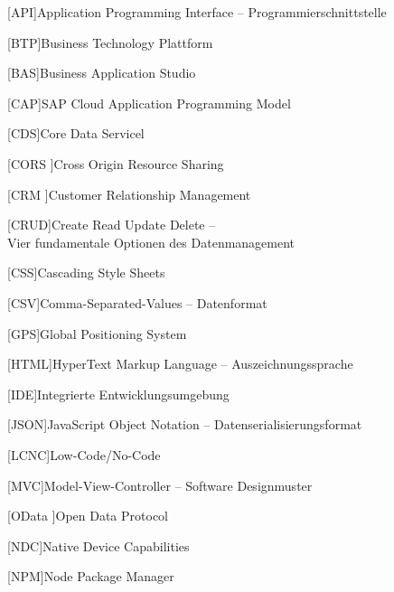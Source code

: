 

\begin{acronym}[EUDAMED]


[API]{Application Programming Interface -- Programmierschnittstelle}

[BTP]{Business Technology Plattform}

[BAS]{Business Application Studio}

[CAP]{SAP Cloud Application Programming Model}

[CDS]{Core Data Servicel}

[CORS ]{Cross Origin Resource Sharing}

[CRM ]{Customer Relationship Management}

[CRUD]{Create Read Update Delete -- \\Vier fundamentale Optionen des Datenmanagement}

[CSS]{Cascading Style Sheets}

[CSV]{Comma-Separated-Values -- Datenformat}

[GPS]{Global Positioning System}

[HTML]{HyperText Markup Language -- Auszeichnungssprache}

[IDE]{Integrierte Entwicklungsumgebung}

[JSON]{JavaScript Object Notation -- Datenserialisierungsformat}

[LCNC]{Low-Code/No-Code}

[MVC]{Model-View-Controller -- Software Designmuster}

[OData ]{Open Data Protocol}

[NDC]{Native Device Capabilities}

[NPM]{Node Package Manager}


\end{acronym}
